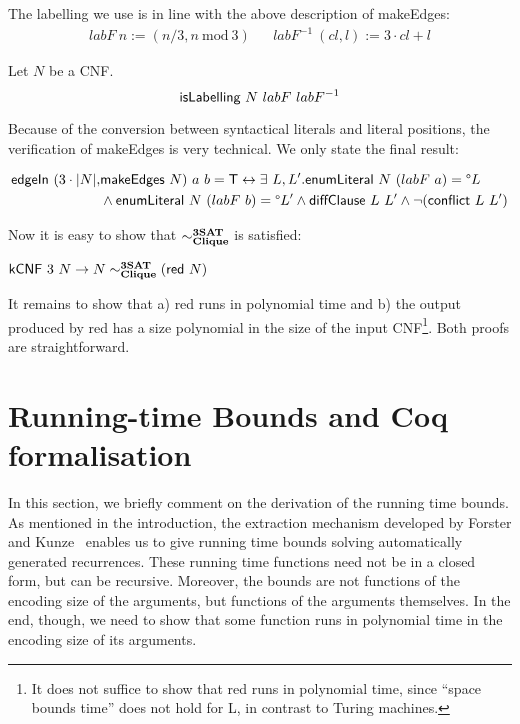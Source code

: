\documentclass[a4paper,UKenglish,cleveref, autoref]{lipics-v2019}
\begin{document}
The labelling we use is in line with the above description of \textsf{makeEdges}:
\begin{align*}
  labF~n := (n/3, n~\text{mod}~3) && labF^{-1}~(cl, l) := 3 \cdot cl + l
\end{align*}
  
\begin{proposition}
  Let $N$ be a CNF. 
  \[\normalfont\textsf{isLabelling}~N~labF~labF^{-1} \]
\end{proposition}

Because of the conversion between syntactical literals and literal positions, the verification of \textsf{makeEdges} is very technical. We only state the final result:
\begin{lemma}
  \begin{align*}
    \normalfont\textsf{edgeIn}~(3\cdot |N|, &\normalfont\textsf{makeEdges}~N)~a~b = \mathsf{T} \leftrightarrow \exists~L,L'. \normalfont\textsf{enumLiteral}~N~(labF~a) = \degree L \\
    &\land \normalfont\textsf{enumLiteral}~N~(labF~b) = \degree L' \land \normalfont\textsf{diffClause}~L~L' \land \lnot(\normalfont\textsf{conflict}~L~L')
  \end{align*}
\end{lemma}

Now it is easy to show that $\sim^{\textbf{3SAT}}_{\textbf{Clique}}$ is satisfied:
\begin{corollary}\label{prop:redredrel}
  $\normalfont\textsf{kCNF}~3~N \rightarrow N \sim^{\textbf{3SAT}}_{\textbf{Clique}} (\normalfont\textsf{red}~N) $
\end{corollary}

It remains to show that a) \textsf{red} runs in polynomial time and b) the output produced by \textsf{red} has a size polynomial in the size of the input CNF\footnote{It does not suffice to show that \textsf{red} runs in polynomial time, since ``space bounds time'' does not hold for L, in contrast to Turing machines.}. Both proofs are straightforward.

\section{Running-time Bounds and Coq formalisation}
In this section, we briefly comment on the derivation of the running time bounds. As mentioned in the introduction, the extraction mechanism developed by Forster and Kunze~\cite{ForsterKunze:2019:Certifying-extraction} enables us to give running time bounds solving automatically generated recurrences. These running time functions need not be in a closed form, but can be recursive. Moreover, the bounds are not functions of the encoding size of the arguments, but functions of the arguments themselves. 
In the end, though, we need to show that some function runs in polynomial time in the encoding size of its arguments. 
\end{document}
